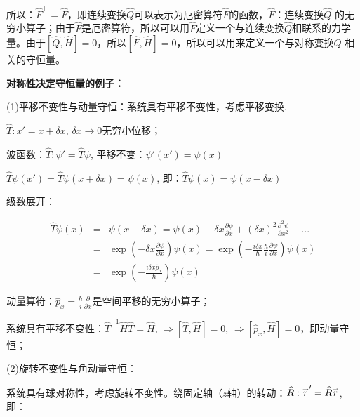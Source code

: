 所以：$\widehat F^ +   = \widehat F$，即连续变换$\hat Q$可以表示为厄密算符$\hat F$的函数，$\hat F$：连续变换$\hat Q$ 的无穷小算子；由于$\hat F$是厄密算符，所以可以用$\hat F$定义一个与连续变换$\hat Q$相联系的力学量。由于$\left[ {\widehat Q,\widehat H} \right] = 0$，所以$\left[ {\widehat F,\widehat H} \right] = 0$，所以可以用来定义一个与对称变换$\hat Q$ 相关的守恒量。


\textbf{对称性决定守恒量的例子：}

(1)平移不变性与动量守恒：系统具有平移不变性，考虑平移变换,



$\widehat T:x' = x + \delta x$, $\delta x \to 0$无穷小位移；

波函数：$\widehat T:\psi ' = \widehat T\psi $, 平移不变：$\psi '(x') = \psi (x)$

$\widehat T\psi (x') = \widehat T\psi (x + \delta x) = \psi (x)$, 即：$\widehat T\psi (x) = \psi (x - \delta x)$

级数展开：

\begin{eqnarray*}
\widehat T\psi (x) & = & \psi (x - \delta x) = \psi (x) - \delta x\frac{{\partial \psi }}{{\partial x}} + \left( {\delta x} \right)^2 \frac{{\partial ^2 \psi }}{{\partial x^2 }} - ... \\
{} & = & \exp \left( { - \delta x\frac{{\partial \psi }}{{\partial x}}} \right)\psi (x) =
 \exp \left( { - \frac{{i\delta x}}{\hbar }\frac{\hbar }{i}\frac{{\partial \psi }}{{\partial x}}} \right)\psi (x) \\
 {} & = & \exp \left( { - \frac{{i\delta x\widehat p_x }}{\hbar }} \right)\psi (x) 
\end{eqnarray*}



动量算符：$\widehat p_x  = \frac{\hbar }{i}\frac{\partial }{{\partial x}}$是空间平移的无穷小算子；

系统具有平移不变性：$\widehat T^{ - 1} \widehat H\widehat T = \widehat H$, $ \Rightarrow \left[ {\widehat T,\widehat H} \right] = 0$, $ \Rightarrow \left[ {\widehat p_x ,\widehat H} \right] = 0$，即动量守恒；

(2)旋转不变性与角动量守恒：


系统具有球对称性，考虑旋转不变性。绕固定轴（$z$轴）的转动：$\widehat R:\mathord{\buildrel{\lower3pt\hbox{$\scriptscriptstyle\rightharpoonup$}}
\over r} ' = \widehat R\mathord{\buildrel{\lower3pt\hbox{$\scriptscriptstyle\rightharpoonup$}}
\over r} $, 即：

